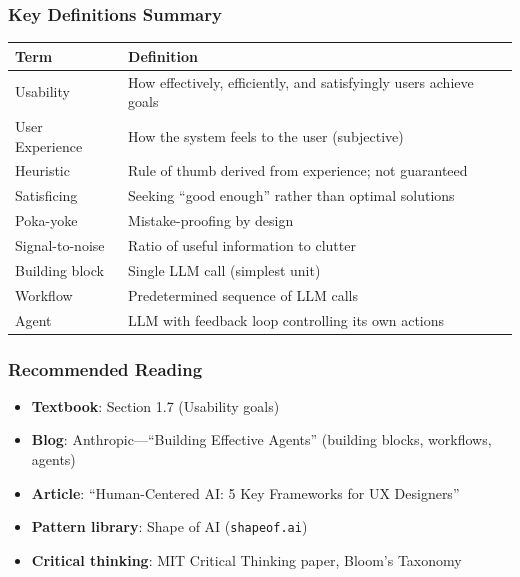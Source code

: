 \subsubsection*{Key Definitions Summary}

\begin{center}
\renewcommand{\arraystretch}{1.3}
\begin{tabular}{@{} l p{8cm} @{}}
\toprule
\textbf{Term} & \textbf{Definition} \\
\midrule
Usability & How effectively, efficiently, and satisfyingly users achieve goals \\
User Experience & How the system feels to the user (subjective) \\
Heuristic & Rule of thumb derived from experience; not guaranteed \\
Satisficing & Seeking ``good enough'' rather than optimal solutions \\
Poka-yoke & Mistake-proofing by design \\
Signal-to-noise & Ratio of useful information to clutter \\
Building block & Single LLM call (simplest unit) \\
Workflow & Predetermined sequence of LLM calls \\
Agent & LLM with feedback loop controlling its own actions \\
\bottomrule
\end{tabular}
\end{center}

\subsubsection*{Recommended Reading}
\begin{itemize}
  \item \textbf{Textbook}: Section 1.7 (Usability goals)
  \item \textbf{Blog}: Anthropic---``Building Effective Agents'' (building blocks, workflows, agents)
  \item \textbf{Article}: ``Human-Centered AI: 5 Key Frameworks for UX Designers''
  \item \textbf{Pattern library}: Shape of AI (\texttt{shapeof.ai})
  \item \textbf{Critical thinking}: MIT Critical Thinking paper, Bloom's Taxonomy
\end{itemize}


